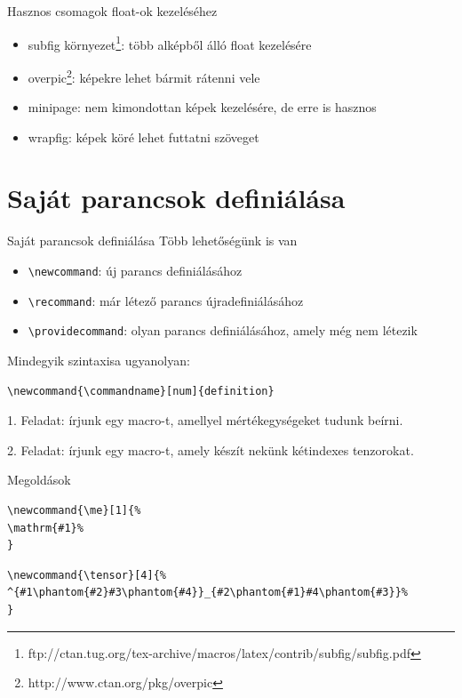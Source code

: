 \documentclass{beamer} %
\begin{document}
\begin{frame}[fragile]{Hasznos csomagok float-ok kezeléséhez}{}
 \begin{itemize}
  \item subfig környezet\footnote{ftp://ctan.tug.org/tex-archive/macros/latex/contrib/subfig/subfig.pdf}: több alképből álló float kezelésére
  \item overpic\footnote{http://www.ctan.org/pkg/overpic}: képekre lehet bármit rátenni vele
  \item minipage: nem kimondottan képek kezelésére, de erre is hasznos
  \item wrapfig: képek köré lehet futtatni szöveget
 \end{itemize}
 
\end{frame}

\section{Saját parancsok definiálása}
\begin{frame}[fragile]{Saját parancsok definiálása}
 Több lehetőségünk is van
 \begin{itemize}
  \item \lstinline|\newcommand|: új parancs definiálásához
  \item \lstinline|\recommand|: már létező parancs újradefiniálásához
  \item \lstinline|\providecommand|: olyan parancs definiálásához, amely még nem létezik
 \end{itemize}
 
 Mindegyik szintaxisa ugyanolyan:
\begin{lstlisting}
\newcommand{\commandname}[num]{definition}
\end{lstlisting}

1. Feladat: írjunk egy macro-t, amellyel mértékegységeket tudunk beírni.

2. Feladat: írjunk egy macro-t, amely készít nekünk kétindexes tenzorokat.
\end{frame}

\begin{frame}[fragile]{Megoldások}
\begin{lstlisting}
\newcommand{\me}[1]{%
\mathrm{#1}%
}
\end{lstlisting}

\begin{lstlisting}
\newcommand{\tensor}[4]{%
^{#1\phantom{#2}#3\phantom{#4}}_{#2\phantom{#1}#4\phantom{#3}}%
}
\end{lstlisting}
\end{frame}
\end{document}
